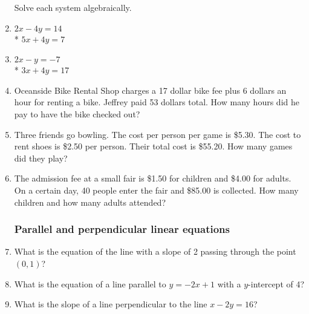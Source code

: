 \documentclass[12pt, twoside]{article}
\begin{document}
\begin{enumerate}
\newpage
  Solve each system algebraically.
  \item
  $2x-4y=14$\\*
  $5x+4y=7$ \vspace{6cm}

  \item
  $2x-y=-7$\\*
  $3x+4y=17$  \vspace{6cm}


  

\newpage
  \item Oceanside Bike Rental Shop charges a 17 dollar bike fee plus 6 dollars an hour for renting a bike. Jeffrey paid 53 dollars total. How many hours did he pay to have the bike checked out? \vspace{6cm}

  \item Three friends go bowling. The cost per person per game is \$5.30. The cost to rent shoes is \$2.50 per person. Their total cost is \$55.20. How many games did they play? \vspace{6cm}

  \item The admission fee at a small fair is \$1.50 for children and \$4.00 for adults. On a certain day, 40 people enter the fair and \$85.00 is collected. How many children and how many adults attended?

\newpage
\subsubsection*{Parallel and perpendicular linear equations}

  \item What is the equation of the line with a slope of 2 passing through the point $(0,1)$? \vspace{4cm}
  \item What is the equation of a line parallel to $y=-2x+1$ with a $y$-intercept of 4? \vspace{4cm}
  \item What is the slope of a line perpendicular to the line $x-2y=16$? 
\end{enumerate}
\end{document}
